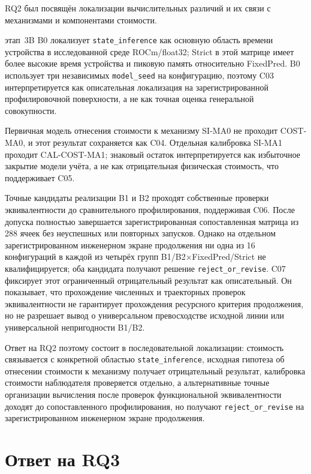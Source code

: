 RQ2 был посвящён локализации вычислительных различий и их связи с
механизмами и компонентами стоимости.

этап~3B B0 локализует \texttt{state\_inference} как основную область времени
устройства в исследованной среде ROCm/float32; Strict в этой матрице имеет
более высокие время устройства и пиковую память относительно FixedPred. B0
использует три независимых \texttt{model\_seed} на конфигурацию, поэтому C03
интерпретируется как описательная локализация на зарегистрированной
профилировочной поверхности, а не как точная оценка генеральной совокупности.

Первичная модель отнесения стоимости к механизму SI-MA0 не проходит COST-MA0,
и этот результат сохраняется как C04. Отдельная калибровка SI-MA1 проходит
CAL-COST-MA1; знаковый остаток интерпретируется как избыточное закрытие модели
учёта, а не как отрицательная физическая стоимость, что поддерживает C05.

Точные кандидаты реализации B1 и B2 проходят собственные проверки
эквивалентности до сравнительного профилирования, поддерживая C06. После
допуска полностью завершается зарегистрированная сопоставленная матрица из 288
ячеек без неуспешных или повторных запусков. Однако на отдельном
зарегистрированном инженерном экране продолжения ни одна из 16 конфигураций в
каждой из четырёх групп B1/B2×FixedPred/Strict не квалифицируется; оба кандидата
получают решение \texttt{reject\_or\_revise}. C07 фиксирует этот ограниченный
отрицательный результат как описательный. Он показывает, что прохождение
численных и траекторных проверок эквивалентности не гарантирует прохождения
ресурсного критерия продолжения, но не разрешает вывод о универсальном
превосходстве исходной линии или универсальной непригодности B1/B2.

Ответ на RQ2 поэтому состоит в последовательной локализации: стоимость
связывается с конкретной областью \texttt{state\_inference}, исходная гипотеза
об отнесении стоимости к механизму получает отрицательный результат,
калибровка стоимости наблюдателя проверяется отдельно, а альтернативные точные
организации вычисления после проверок функциональной эквивалентности доходят до
сопоставленного профилирования, но получают \texttt{reject\_or\_revise} на
зарегистрированном инженерном экране продолжения.

\section{Ответ на RQ3}
\label{sec:conclusion-rq3}

